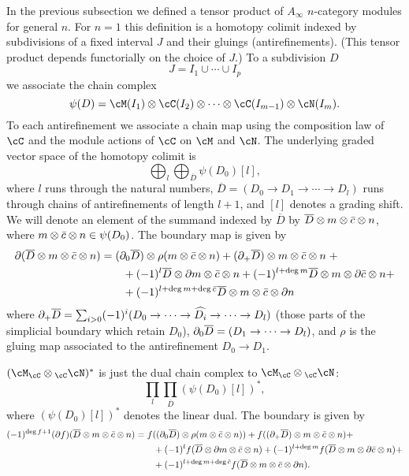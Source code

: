 \def\olD{{\overline D}}
\def\cbar{{\bar c}}
In the previous subsection we defined a tensor product of $A_\infty$ $n$-category modules
for general $n$.
For $n=1$ this definition is a homotopy colimit indexed by subdivisions of a fixed interval $J$
and their gluings (antirefinements).
(This tensor product depends functorially on the choice of $J$.)
To a subdivision $D$
\[
	J = I_1\cup \cdots\cup I_p
\]
we associate the chain complex
\[
	\psi(D) = \cM(I_1)\ot\cC(I_2)\ot\cdots\ot\cC(I_{m-1})\ot\cN(I_m) .
\]
To each antirefinement we associate a chain map using the composition law of $\cC$ and the 
module actions of $\cC$ on $\cM$ and $\cN$.
The underlying graded vector space of the homotopy colimit is
\[
	\bigoplus_l \bigoplus_{\olD} \psi(D_0)[l] ,
\]
where $l$ runs through the natural numbers, $\olD = (D_0\to D_1\to\cdots\to D_l)$
runs through chains of antirefinements of length $l+1$, and $[l]$ denotes a grading shift.
We will denote an element of the summand indexed by $\olD$ by
$\olD\ot m\ot\cbar\ot n$, where $m\ot\cbar\ot n \in \psi(D_0)$.
The boundary map is given by
\begin{align*}
	\bd(\olD\ot m\ot\cbar\ot n) &= (\bd_0 \olD)\ot \rho(m\ot\cbar\ot n) + (\bd_+ \olD)\ot m\ot\cbar\ot n \; + \\
	& \qquad + (-1)^l \olD\ot\bd m\ot\cbar\ot n + (-1)^{l+\deg m}  \olD\ot m\ot\bd \cbar\ot n + \\
	& \qquad + (-1)^{l+\deg m + \deg \cbar}  \olD\ot m\ot \cbar\ot \bd n
\end{align*}
where $\bd_+ \olD = \sum_{i>0} (-1)^i (D_0\to \cdots \to \widehat{D_i} \to \cdots \to D_l)$ (those parts of the simplicial
boundary which retain $D_0$), $\bd_0 \olD = (D_1 \to \cdots \to D_l)$,
and $\rho$ is the gluing map associated to the antirefinement $D_0\to D_1$.

$(\cM_\cC\ot {_\cC\cN})^*$ is just the dual chain complex to $\cM_\cC\ot {_\cC\cN}$:
\[
	\prod_l \prod_{\olD} (\psi(D_0)[l])^* ,
\]
where $(\psi(D_0)[l])^*$ denotes the linear dual.
The boundary is given by
\begin{align}
\label{eq:tensor-product-boundary}
	 (-1)^{\deg f +1} (\bd f)(\olD\ot m\ot\cbar\ot n) & = f((\bd_0 \olD)\ot \rho(m\ot\cbar\ot n)) +  f((\bd_+ \olD)\ot m\ot\cbar\ot n) + \\
						     & \qquad + (-1)^{l} f(\olD\ot\bd m\ot\cbar \ot n)  + (-1)^{l + \deg m} f(\olD\ot m\ot\bd \cbar \ot n)  + \notag \\
			& \qquad	 + (-1)^{l + \deg m + \deg \cbar} f(\olD\ot m\ot\cbar\ot \bd n). \notag
\end{align}

